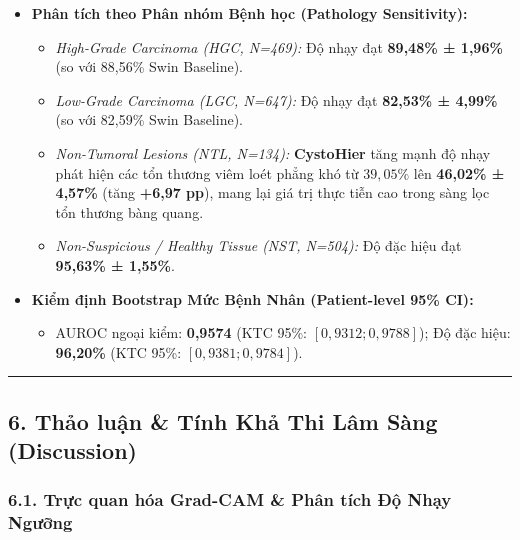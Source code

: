 \documentclass[
  11pt,
  a4paper,
]{article}
\providecommand{\tightlist}{%
  \setlength{\itemsep}{0pt}\setlength{\parskip}{0pt}}
\begin{document}
\begin{itemize}
\tightlist
\item
  \textbf{Phân tích theo Phân nhóm Bệnh học (Pathology Sensitivity):}

  \begin{itemize}
  \tightlist
  \item
    \emph{High-Grade Carcinoma (HGC, N=469):} Độ nhạy đạt
    \textbf{89,48\% ± 1,96\%} (so với 88,56\% Swin Baseline).
  \item
    \emph{Low-Grade Carcinoma (LGC, N=647):} Độ nhạy đạt \textbf{82,53\%
    ± 4,99\%} (so với 82,59\% Swin Baseline).
  \item
    \emph{Non-Tumoral Lesions (NTL, N=134):} \textbf{CystoHier} tăng
    mạnh độ nhạy phát hiện các tổn thương viêm loét phẳng khó từ
    \(39{,}05\%\) lên \textbf{46,02\% ± 4,57\%} (tăng \textbf{+6,97
    pp}), mang lại giá trị thực tiễn cao trong sàng lọc tổn thương bàng
    quang.
  \item
    \emph{Non-Suspicious / Healthy Tissue (NST, N=504):} Độ đặc hiệu đạt
    \textbf{95,63\% ± 1,55\%}.
  \end{itemize}
\item
  \textbf{Kiểm định Bootstrap Mức Bệnh Nhân (Patient-level 95\% CI):}

  \begin{itemize}
  \tightlist
  \item
    AUROC ngoại kiểm: \textbf{0,9574} (KTC 95\%: \([0,9312; 0,9788]\));
    Độ đặc hiệu: \textbf{96,20\%} (KTC 95\%: \([0,9381; 0,9784]\)).
  \end{itemize}
\end{itemize}

\begin{center}\rule{0.5\linewidth}{0.5pt}\end{center}

\subsection{6. Thảo luận \& Tính Khả Thi Lâm Sàng
(Discussion)}\label{thux1ea3o-luux1eadn-tuxednh-khux1ea3-thi-luxe2m-suxe0ng-discussion}

\subsubsection{6.1. Trực quan hóa Grad-CAM \& Phân tích Độ Nhạy
Ngưỡng}\label{trux1ef1c-quan-huxf3a-grad-cam-phuxe2n-tuxedch-ux111ux1ed9-nhux1ea1y-ngux1b0ux1ee1ng}
\end{document}
